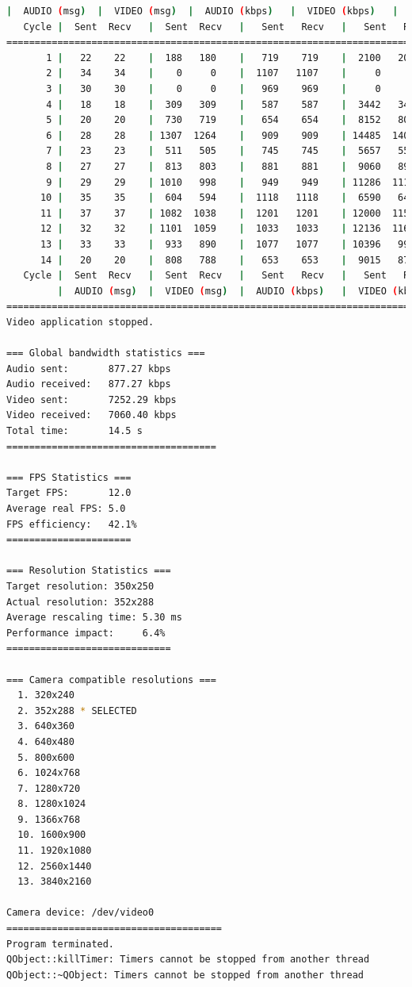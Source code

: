 \begin{lstlisting}[language=bash,basicstyle=\ttfamily\tiny]
         |  AUDIO (msg)  |  VIDEO (msg)  |  AUDIO (kbps)   |  VIDEO (kbps)   |     CPU (%) 
   Cycle |  Sent  Recv   |  Sent  Recv   |   Sent   Recv   |   Sent   Recv   | Program System
================================================================================================
       1 |   22    22    |  188   180    |   719    719    |  2100   2010    |  30      0       
       2 |   34    34    |    0     0    |  1107   1107    |     0      0    |  35     76       
       3 |   30    30    |    0     0    |   969    969    |     0      0    |  32     78       
       4 |   18    18    |  309   309    |   587    587    |  3442   3442    |  21     81       
       5 |   20    20    |  730   719    |   654    654    |  8152   8032    |  20     75       
       6 |   28    28    | 1307  1264    |   909    909    | 14485  14008    |  34     76       
       7 |   23    23    |  511   505    |   745    745    |  5657   5593    |  15     77       
       8 |   27    27    |  813   803    |   881    881    |  9060   8946    |  35     72       
       9 |   29    29    | 1010   998    |   949    949    | 11286  11151    |  19     76       
      10 |   35    35    |  604   594    |  1118   1118    |  6590   6483    |  43     75       
      11 |   37    37    | 1082  1038    |  1201   1201    | 12000  11511    |  30     73       
      12 |   32    32    | 1101  1059    |  1033   1033    | 12136  11673    |  34     73       
      13 |   33    33    |  933   890    |  1077   1077    | 10396   9917    |  32     75       
      14 |   20    20    |  808   788    |   653    653    |  9015   8794    |  24     69       
   Cycle |  Sent  Recv   |  Sent  Recv   |   Sent   Recv   |   Sent   Recv   | Program System
         |  AUDIO (msg)  |  VIDEO (msg)  |  AUDIO (kbps)   |  VIDEO (kbps)   |     CPU (%) 
===========================================================================================
Video application stopped.

=== Global bandwidth statistics ===
Audio sent:       877.27 kbps
Audio received:   877.27 kbps
Video sent:       7252.29 kbps
Video received:   7060.40 kbps
Total time:       14.5 s
=====================================

=== FPS Statistics ===
Target FPS:       12.0
Average real FPS: 5.0
FPS efficiency:   42.1%
======================

=== Resolution Statistics ===
Target resolution: 350x250
Actual resolution: 352x288
Average rescaling time: 5.30 ms
Performance impact:     6.4%
=============================

=== Camera compatible resolutions ===
  1. 320x240
  2. 352x288 * SELECTED
  3. 640x360
  4. 640x480
  5. 800x600
  6. 1024x768
  7. 1280x720
  8. 1280x1024
  9. 1366x768
  10. 1600x900
  11. 1920x1080
  12. 2560x1440
  13. 3840x2160

Camera device: /dev/video0
======================================
Program terminated.
QObject::killTimer: Timers cannot be stopped from another thread
QObject::~QObject: Timers cannot be stopped from another thread
\end{lstlisting}

